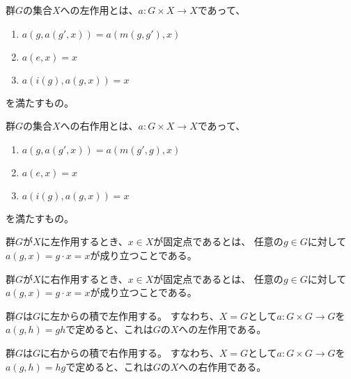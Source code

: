 \begin{definition}\label{left-action-def}
    \leanok
    群$G$の集合$X$への左作用とは、$a:G\times X\to X$であって、
    \begin{enumerate}
        \item $a(g,a(g',x))=a(m(g,g'),x)$
        \item $a(e,x)=x$
        \item $a(i(g),a(g,x))=x$
    \end{enumerate}
    を満たすもの。
\end{definition}

\begin{definition}\label{right-action-def}
    群$G$の集合$X$への右作用とは、$a:G\times X\to X$であって、
    \begin{enumerate}
        \item $a(g,a(g',x))=a(m(g',g),x)$
        \item $a(e,x)=x$
        \item $a(i(g),a(g,x))=x$
    \end{enumerate}
    を満たすもの。
\end{definition}

\begin{proposition}
    \label{left-fixed-point}
    \leanok
    群$G$が$X$に左作用するとき、$x\in X$が固定点であるとは、
    任意の$g\in G$に対して$a(g,x)=g\cdot x=x$が成り立つことである。
\end{proposition}

\begin{proposition}
    \label{right-fixed-point}
    群$G$が$X$に右作用するとき、$x\in X$が固定点であるとは、
    任意の$g\in G$に対して$a(g,x)=g\cdot x=x$が成り立つことである。
\end{proposition}

\begin{proposition}
    \label{left-multiplication}
    \leanok
    群$G$は$G$に左からの積で左作用する。
    すなわち、$X=G$として$a:G\times G\to G$を$a(g,h)=gh$で定めると、これは$G$の$X$への左作用である。
\end{proposition}

\begin{proposition}
    \label{right-multiplication}
    群$G$は$G$に右からの積で右作用する。
    すなわち、$X=G$として$a:G\times G\to G$を$a(g,h)=hg$で定めると、これは$G$の$X$への右作用である。
\end{proposition}

